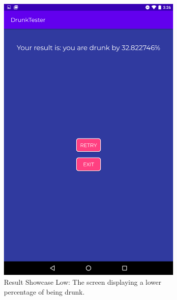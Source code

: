 \documentclass[12pt,a4paper]{article}
\begin{document}
\begin{figure}[htb!]
    \begin{subfigure}[b]{0.35\textwidth}
        \includegraphics[width=\textwidth]{materials/Showcase_result_low.png}
        \caption*{Result Showcase Low: The screen displaying a lower percentage of being drunk.}
    \end{subfigure}
    \hfill
    \begin{subfigure}[b]{0.35\textwidth}

\end{subfigure}
\end{figure}
\end{document}
